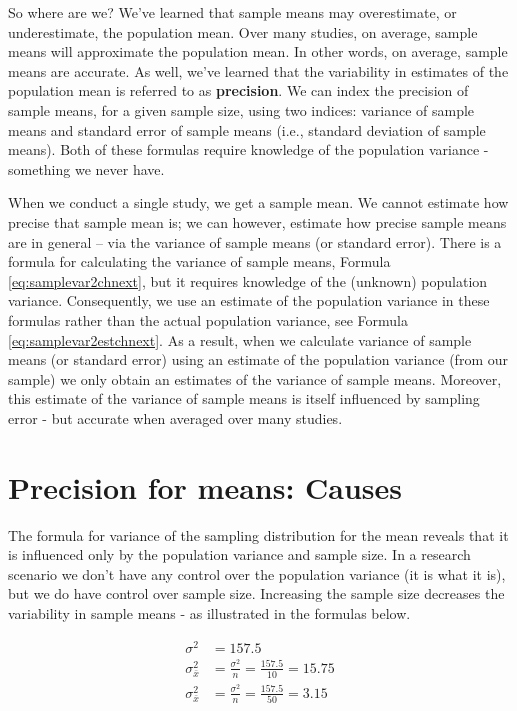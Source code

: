 \documentclass[
]{krantz}
\begin{document}
So where are we? We've learned that sample means may overestimate, or underestimate, the population mean. Over many studies, on average, sample means will approximate the population mean. In other words, on average, sample means are accurate. As well, we've learned that the variability in estimates of the population mean is referred to as \textbf{precision}. We can index the precision of sample means, for a given sample size, using two indices: variance of sample means and standard error of sample means (i.e., standard deviation of sample means). Both of these formulas require knowledge of the population variance - something we never have.

When we conduct a single study, we get a sample mean. We cannot estimate how precise that sample mean is; we can however, estimate how precise sample means are in general -- via the variance of sample means (or standard error). There is a formula for calculating the variance of sample means, Formula \eqref{eq:samplevar2chnext}, but it requires knowledge of the (unknown) population variance. Consequently, we use an estimate of the population variance in these formulas rather than the actual population variance, see Formula \eqref{eq:samplevar2estchnext}. As a result, when we calculate variance of sample means (or standard error) using an estimate of the population variance (from our sample) we only obtain an estimates of the variance of sample means. Moreover, this estimate of the variance of sample means is itself influenced by sampling error - but accurate when averaged over many studies.

\hypertarget{precision-for-means-causes}{%
\section{Precision for means: Causes}\label{precision-for-means-causes}}

The formula for variance of the sampling distribution for the mean reveals that it is influenced only by the population variance and sample size. In a research scenario we don't have any control over the population variance (it is what it is), but we do have control over sample size. Increasing the sample size decreases the variability in sample means - as illustrated in the formulas below.

\[
\begin{aligned} 
\sigma^2 &= 157.5 \\
\sigma_{\bar{x}}^2 &= \frac{\sigma^2}{n} = \frac{157.5}{10} = 15.75 \\
\sigma_{\bar{x}}^2 &= \frac{\sigma^2}{n} = \frac{157.5}{50} = 3.15 \\
\end{aligned} 
\]
\end{document}

